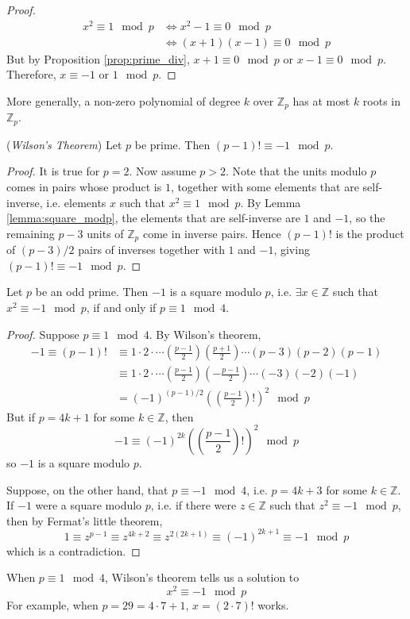 \documentclass[10pt, a4paper, twoside]{report}
\begin{document}
\begin{proof}
    \begin{align*}
        x^2\equiv 1\mod p &\Leftrightarrow x^2-1\equiv 0\mod p \\
        &\Leftrightarrow (x+1)(x-1)\equiv 0\mod p
    \end{align*}
    But by Proposition \ref{prop:prime_div}, \(x+1\equiv 0\mod p\) or \(x-1\equiv 0\mod p\). Therefore, \(x\equiv -1\text{  or  }1\mod p\).
\end{proof}
More generally, a non-zero polynomial of degree \(k\) over \(\mathbb{Z}_p\) has at most \(k\) roots in \(\mathbb{Z}_p\).
\begin{theorem}
    (\emph{Wilson's Theorem}) Let \(p\) be prime. Then \((p-1)!\equiv -1\mod p\).
    \label{thm:wilson}
\end{theorem}
\begin{proof}
    It is true for \(p=2\). Now assume \(p>2\). Note that the units modulo \(p\) comes in pairs whose product is \(1\), together with some elements that are self-inverse, i.e. elements \(x\) such that \(x^2\equiv 1\mod p\). By Lemma \ref{lemma:square_modp}, the elements that are self-inverse are \(1\) and \(-1\), so the remaining \(p-3\) units of \(\mathbb{Z}_p\) come in inverse pairs. Hence \((p-1)!\) is the product of \((p-3)/2\) pairs of inverses together with \(1\) and \(-1\), giving \((p-1)!\equiv -1\mod p\).
\end{proof}
\begin{proposition}
    Let \(p\) be an odd prime. Then \(-1\) is a square modulo \(p\), i.e. \(\exists x\in\mathbb{Z}\) such that \(x^2\equiv -1\mod p\), if and only if \(p\equiv 1\mod 4\).
\end{proposition}
\begin{proof}
    Suppose \(p\equiv 1\mod 4\). By Wilson's theorem, 
    \begin{align*}
        -1\equiv (p-1)! &\equiv 1\cdot 2\cdot\cdots\left(\frac{p-1}{2}\right)\left(\frac{p+1}{2}\right)\cdots(p-3)(p-2)(p-1) \\
        &\equiv 1\cdot 2\cdot\cdots\left(\frac{p-1}{2}\right)\left(-\frac{p-1}{2}\right)\cdots(-3)(-2)(-1) \\
        &=(-1)^{(p-1)/2}\left(\left(\frac{p-1}2\right)!\right)^2\mod p 
    \end{align*}
    But if \(p=4k+1\) for some \(k\in\mathbb{Z}\), then 
    \[-1\equiv(-1)^{2k}\left(\left(\frac{p-1}2\right)!\right)^2\mod p\]
    so \(-1\) is a square modulo \(p\).

    Suppose, on the other hand, that \(p\equiv -1\mod 4\), i.e. \(p=4k+3\) for some \(k\in\mathbb{Z}\). If \(-1\) were a square modulo \(p\), i.e. if there were \(z\in\mathbb{Z}\) such that \(z^2\equiv -1\mod p\), then by Fermat's little theorem, 
    \[1\equiv z^{p-1}\equiv z^{4k+2}\equiv z^{2(2k+1)}\equiv (-1)^{2k+1}\equiv -1\mod p\]
    which is a contradiction.
\end{proof}
\begin{remark}
    When \(p\equiv 1\mod 4\), Wilson's theorem tells us a solution to \[x^2\equiv -1\mod p\]
    For example, when \(p=29=4\cdot 7+1\), \(x=(2\cdot 7)!\) works.
\end{remark}
\end{document}
